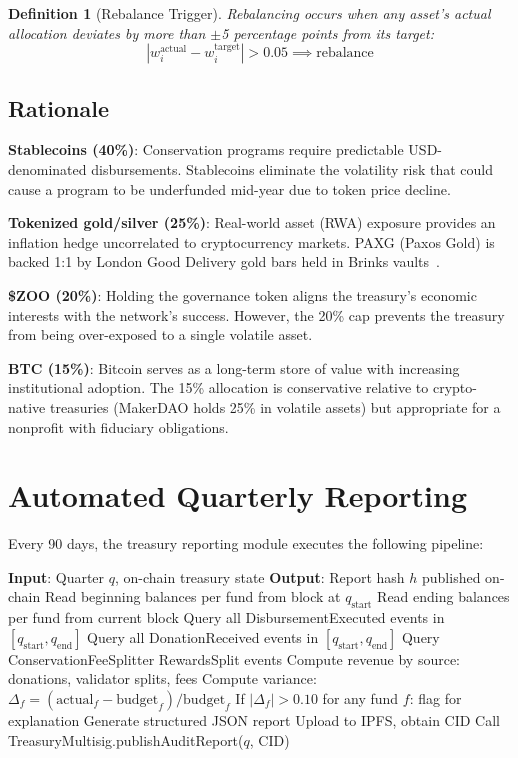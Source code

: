 \documentclass[11pt,letterpaper]{article}
\newtheorem{definition}{Definition}[section]
\begin{document}
\begin{definition}[Rebalance Trigger]
Rebalancing occurs when any asset's actual allocation deviates by more than $\pm$5 percentage points from its target:
\begin{equation}
    |w_i^{\text{actual}} - w_i^{\text{target}}| > 0.05 \implies \text{rebalance}
\end{equation}
\end{definition}

\subsection{Rationale}

\textbf{Stablecoins (40\%)}: Conservation programs require predictable USD-denominated disbursements. Stablecoins eliminate the volatility risk that could cause a program to be underfunded mid-year due to token price decline.

\textbf{Tokenized gold/silver (25\%)}: Real-world asset (RWA) exposure provides an inflation hedge uncorrelated to cryptocurrency markets. PAXG (Paxos Gold) is backed 1:1 by London Good Delivery gold bars held in Brinks vaults~\cite{paxos2023}.

\textbf{\$ZOO (20\%)}: Holding the governance token aligns the treasury's economic interests with the network's success. However, the 20\% cap prevents the treasury from being over-exposed to a single volatile asset.

\textbf{BTC (15\%)}: Bitcoin serves as a long-term store of value with increasing institutional adoption. The 15\% allocation is conservative relative to crypto-native treasuries (MakerDAO holds 25\% in volatile assets) but appropriate for a nonprofit with fiduciary obligations.

\section{Automated Quarterly Reporting}
\label{sec:reporting}

Every 90 days, the treasury reporting module executes the following pipeline:

\begin{algorithm}[t]
\caption{Quarterly Report Generation}
\label{alg:report}
\begin{algorithmic}[1]
\STATE \textbf{Input}: Quarter $q$, on-chain treasury state
\STATE \textbf{Output}: Report hash $h$ published on-chain
\STATE Read beginning balances per fund from block at $q_{\text{start}}$
\STATE Read ending balances per fund from current block
\STATE Query all DisbursementExecuted events in $[q_{\text{start}}, q_{\text{end}}]$
\STATE Query all DonationReceived events in $[q_{\text{start}}, q_{\text{end}}]$
\STATE Query ConservationFeeSplitter RewardsSplit events
\STATE Compute revenue by source: donations, validator splits, fees
\STATE Compute variance: $\Delta_f = (\text{actual}_f - \text{budget}_f) / \text{budget}_f$
\STATE If $|\Delta_f| > 0.10$ for any fund $f$: flag for explanation
\STATE Generate structured JSON report
\STATE Upload to IPFS, obtain CID
\STATE Call TreasuryMultisig.publishAuditReport($q$, CID)
\end{algorithmic}
\end{algorithm}
\end{document}
